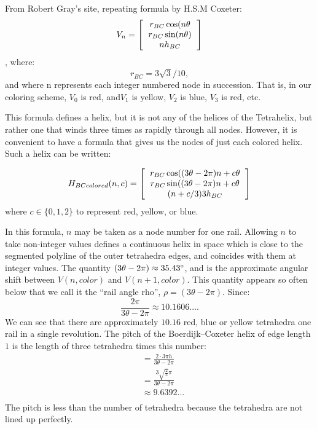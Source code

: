 \documentclass[11pt]{article}
\begin{document}
From Robert Gray's site, repeating formula by H.S.M Coxeter:
\[
V_n =
\left [
  \begin{tabular}{c}
   $ r_{BC} \cos(n \theta $\\
   $ r_{BC} \sin(n \theta) $\\
   $ n h_{BC}  $
  \end{tabular}
\right ]  
\],
where:
\[
r_{BC} = 3\sqrt{3} / 10, 
\]
and where n represents each integer numbered node in succession. That is, in our coloring scheme, $V_0$ is red, and$ V_1$ is yellow,  $V_2$ is blue,
$V_3$ is red, etc. 

This formula defines a helix, but it is not any of the helices of the Tetrahelix, but rather one that winds three times
as rapidly through all nodes. However, it is convenient to have a formula that gives us the nodes of just
each colored helix. Such a helix can be written:

\[
H_{BCcolored}(n,c) =
\left [
  \begin{tabular}{c}
   $ r_{BC}  \cos((3 \theta - 2 \pi)n + c  \theta $\\
   $ r_{BC} \sin((3 \theta - 2 \pi)n + c  \theta $\\
   $ (n + c/3) 3  h_{BC} $
  \end{tabular}
\right ]
\]
where $c \in \{0,1,2\}$ to represent red, yellow, or blue.

In this formula, $n$ may be taken as a node number for one rail. Allowing $n$ to take non-integer values defines a continuous
helix in space which is close to the segmented polyline of the outer tetrahedra edges, and coincides with them at integer
values.
The quantity $ (3 \theta - 2 \pi) \approx 35.43 \degree $, and is the approximate angular shift between $V(n,color)$ and
$V(n+1,color)$. This quantity appears so often below that we call it the ``rail angle rho'', $\rho = (3 \theta - 2 \pi)$.
Since:
\[ \frac{2 \pi}{3 \theta - 2 \pi} \approx 10.1606....
\]
We can see that there are approximately $10.16$ red, blue or yellow tetrahedra one rail in a single revolution.
The pitch of the Boerdijk--Coxeter helix of edge length $1$ is the length of three tetrahedra times this number:
\begin{align*}
  &= \frac{2 \cdot 3 \pi h}{3 \theta - 2\pi} \\
  &= \frac{3  \sqrt{\frac{2}{5}}  \pi}{3  \theta - 2 \pi} \\
  &\approx 9.6392... \\
\end{align*}
The pitch is less than the number of tetrahedra because the tetrahedra are not lined up perfectly.
\end{document}
